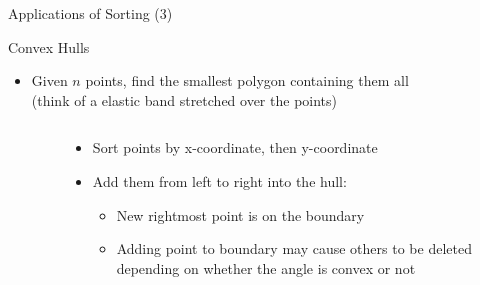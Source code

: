 \begin{frame}{Applications of Sorting (3)}
  \begin{block}{Convex Hulls}
    \begin{itemize}
    \item Given $n$ points, find the smallest polygon containing them all\\
      {\small (think of a elastic band stretched over the points)}
    \end{itemize}\vspace{-.2\baselineskip}
    \begin{columns}
      \begin{column}{.2\linewidth}
      \end{column}
      \begin{column}{.75\linewidth}
        \begin{itemize}
        \item Sort points by x-coordinate, then y-coordinate
        \item Add them from left to right into the hull:
          \begin{itemize}
          \item New rightmost point is on the boundary
          \item Adding point to boundary may cause others to be deleted\\
            {\small depending on whether the angle is convex or not}
          \end{itemize}
        \end{itemize}
      \end{column}
    \end{columns}
  \end{block}


\end{frame}
